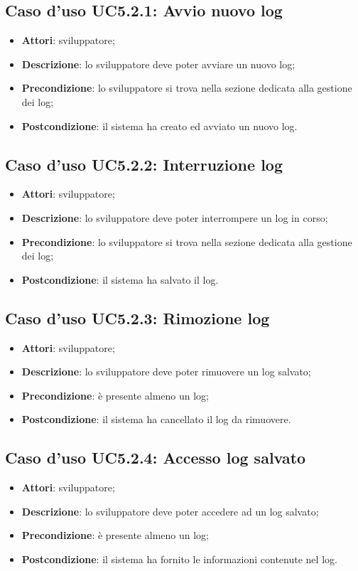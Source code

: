 \documentclass[../AnalisiDeiRequisiti.tex]{subfiles}
\begin{document}
\subsection{Caso d'uso UC5.2.1: Avvio nuovo log}
\begin{itemize}
\item \textbf{Attori}: sviluppatore;
\item \textbf{Descrizione}: lo sviluppatore deve poter avviare un nuovo log; 
      \item \textbf{Precondizione}: lo sviluppatore si trova nella sezione dedicata alla gestione dei log;
    \item \textbf{Postcondizione}: il sistema ha creato ed avviato un nuovo log.
  \end{itemize}
\hypertarget{UC5.2.2}{}
\subsection{Caso d'uso UC5.2.2: Interruzione log}
\begin{itemize}
\item \textbf{Attori}: sviluppatore;
\item \textbf{Descrizione}: lo sviluppatore deve poter interrompere un log in corso; 
      \item \textbf{Precondizione}: lo sviluppatore si trova nella sezione dedicata alla gestione dei log;
    \item \textbf{Postcondizione}: il sistema ha salvato il log.
  \end{itemize}
\hypertarget{UC5.2.3}{}
\subsection{Caso d'uso UC5.2.3: Rimozione log}
\begin{itemize}
\item \textbf{Attori}: sviluppatore;
\item \textbf{Descrizione}: lo sviluppatore deve poter rimuovere un log salvato; 
      \item \textbf{Precondizione}: è presente almeno un log;
    \item \textbf{Postcondizione}: il sistema ha cancellato il log da rimuovere.
  \end{itemize}
\hypertarget{UC5.2.4}{}
\subsection{Caso d'uso UC5.2.4: Accesso log salvato}
\begin{itemize}
\item \textbf{Attori}: sviluppatore;
\item \textbf{Descrizione}: lo sviluppatore deve poter accedere ad un log salvato; 
      \item \textbf{Precondizione}: è presente almeno un log;
    \item \textbf{Postcondizione}: il sistema ha fornito le informazioni contenute nel log.
  \end{itemize}
\hypertarget{UC6}{}
\end{document}
